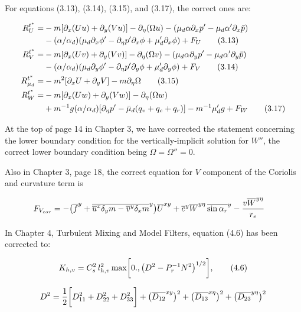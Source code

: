 \documentclass[12pt]{book}
\begin{document}
\noindent
For equations (3.13), (3.14), (3.15), and (3.17), the correct ones are:

%
\begin{align}
R_U^{t^*} = &
- m[\partial_x(Uu) + \partial_y(Vu)] - \partial_\eta (\Omega u)
- ({\mu}_d \alpha \partial_x p'   
- {\mu}_d \alpha' \partial_x \bar{p}) ~~~~~~~~ \notag
\\
& - (\alpha/\alpha_d) ( {\mu}_d \partial_x \phi' 
  -  \partial_\eta p' \partial_x \phi
  + {\mu}_d' \partial_x \phi ) + F_U
\tag{3.13}
\\
%
R_V^{t^*} = &
- m[\partial_x (Uv) + \partial_y (Vv)] - \partial_\eta (\Omega v)
- ({\mu}_d \alpha \partial_y p'
- {\mu}_d \alpha' \partial_y \bar{p}) ~~~~~~~~ \notag
\\
& - (\alpha/\alpha_d) ( {\mu}_d \partial_y \phi'
  - \partial_\eta p' \partial_y \phi
  + {\mu}_d' \partial_y \phi ) + F_V
\tag{3.14}
\\
%
R_{\mu_d}^{t^*} = &
- m^2[\partial_x U + \partial_y V] - m \partial_\eta \Omega
\tag{3.15}
\\
%
R_W^{t^*} = &
- m[\partial_x (Uw) + \partial_y (Vw)] - \partial_\eta
(\Omega w)  ~~~~~~~~ ~~~~~~~~ ~~~~~~~~ ~~~~~~~~ ~~~ \notag
\\
& + m^{-1} g (\alpha/\alpha_d) [\partial_\eta p'
  - {\bar{\mu}}_d (q_v + q_c +q_r)]
  - m^{-1} {\mu}_d'g + F_W
\tag{3.17}
%
\end{align}

\vfill\eject
\noindent
At the top of page 14 in Chapter 3, we have corrected the statement
concerning the lower boundary condition for the vertically-implicit
solution for $W''$, the correct lower boundary condition being
$\Omega = \Omega'' = 0$.

Also in Chapter 3, page 18, the correct equation for $V$ component of 
the Coriolis and curvature term is

\begin{align}
F_{V_{cor}} & =  -
\bigl({\overline f}^y +
{\overline{
{\overline u}^x 
{\delta_y m}
- {\overline v}^y \delta_x m}}^y \bigr)
{\overline U}^{xy}
+ {\overline e}^y
{\overline W}^{y\eta}\, {\overline{\sin \alpha_r}}^y
- {v {\overline W}^{y\eta} \over r_e}
\notag
\end{align}

\noindent
In Chapter 4, Turbulent Mixing and Model Filters, equation (4.6) has been
corrected to:

\begin{equation}
K_{h,v} = C_s^2 \, l_{h,v}^2 \,\hbox{max}
\biggl[ 0., \bigl( D^2 - P_r^{-1} N^2 \bigr)^{1/2}\biggr],
\tag{4.6}
\end{equation}

\begin{equation}
D^2 =
{1 \over 2} \biggl[
D^2_{11} +
D^2_{22} +
D^2_{33} \biggr] +
\bigl({{\overline{D_{12}}}^{xy}}\bigr)^2 +
\bigl({{\overline{D_{13}}}^{x\eta}}\bigr)^2 +
\bigl({{\overline{D_{23}}}^{y\eta}}\bigr)^2
\notag
\end{equation}
\end{document}
